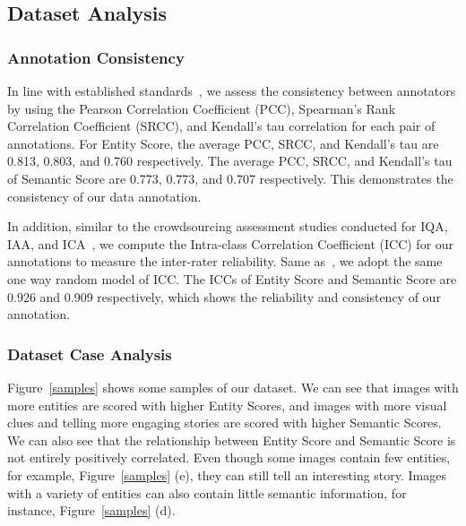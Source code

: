 \subsection{Dataset Analysis}



\subsubsection{Annotation Consistency}

In line with established standards~\cite{kong2016photo, ying2020patches, ic9600}, we assess the consistency between annotators by using the Pearson Correlation Coefficient (PCC), Spearman's Rank Correlation Coefficient (SRCC), and Kendall's tau correlation for each pair of annotations.
For Entity Score, the average PCC, SRCC, and Kendall's tau are 0.813, 0.803, and 0.760 respectively.
The average PCC, SRCC, and Kendall's tau of Semantic Score are 0.773, 0.773, and 0.707 respectively.
This demonstrates the consistency of our data annotation.

In addition, similar to the crowdsourcing assessment studies conducted for IQA, IAA, and ICA~\cite{koniq10k, Siahaan2016, ic9600}, we compute the Intra-class Correlation Coefficient (ICC) for our annotations to measure the inter-rater reliability.
Same as~\citet{koniq10k, Siahaan2016, ic9600}, we adopt the same one way random model of ICC. 
The ICCs of Entity Score and Semantic Score are 0.926 and 0.909 respectively, which shows the reliability and consistency of our annotation.



\subsubsection{Dataset Case Analysis}

Figure~\ref{samples} shows some samples of our dataset. 
We can see that images with more entities are scored with higher Entity Scores, and images with more visual clues and telling more engaging stories are scored with higher Semantic Scores.
We can also see that the relationship between Entity Score and Semantic Score is not entirely positively correlated.
Even though some images contain few entities, for example, Figure~\ref{samples} (e), they can still tell an interesting story.
Images with a variety of entities can also contain little semantic information, for instance, Figure~\ref{samples} (d). 

